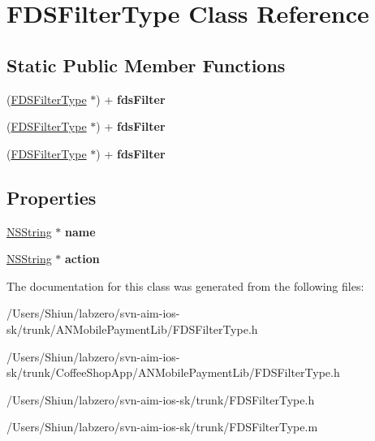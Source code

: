 \hypertarget{interface_f_d_s_filter_type}{
\section{FDSFilterType Class Reference}
\label{interface_f_d_s_filter_type}
}
\subsection*{Static Public Member Functions}
\begin{DoxyCompactItemize}
\item 
\hypertarget{interface_f_d_s_filter_type_a51b8a32200279268d2146917e5ff3239}{
(\hyperlink{interface_f_d_s_filter_type}{FDSFilterType} $\ast$) + {\bfseries fdsFilter}}
\label{interface_f_d_s_filter_type_a51b8a32200279268d2146917e5ff3239}

\item 
\hypertarget{interface_f_d_s_filter_type_a51b8a32200279268d2146917e5ff3239}{
(\hyperlink{interface_f_d_s_filter_type}{FDSFilterType} $\ast$) + {\bfseries fdsFilter}}
\label{interface_f_d_s_filter_type_a51b8a32200279268d2146917e5ff3239}

\item 
\hypertarget{interface_f_d_s_filter_type_a51b8a32200279268d2146917e5ff3239}{
(\hyperlink{interface_f_d_s_filter_type}{FDSFilterType} $\ast$) + {\bfseries fdsFilter}}
\label{interface_f_d_s_filter_type_a51b8a32200279268d2146917e5ff3239}

\end{DoxyCompactItemize}
\subsection*{Properties}
\begin{DoxyCompactItemize}
\item 
\hypertarget{interface_f_d_s_filter_type_a1b2305a84c28883d5e6e51a590944d20}{
\hyperlink{class_n_s_string}{NSString} $\ast$ {\bfseries name}}
\label{interface_f_d_s_filter_type_a1b2305a84c28883d5e6e51a590944d20}

\item 
\hypertarget{interface_f_d_s_filter_type_a785a8d3b58c7dbfd44e742485341a0fc}{
\hyperlink{class_n_s_string}{NSString} $\ast$ {\bfseries action}}
\label{interface_f_d_s_filter_type_a785a8d3b58c7dbfd44e742485341a0fc}

\end{DoxyCompactItemize}


The documentation for this class was generated from the following files:\begin{DoxyCompactItemize}
\item 
/Users/Shiun/labzero/svn-\/aim-\/ios-\/sk/trunk/ANMobilePaymentLib/FDSFilterType.h\item 
/Users/Shiun/labzero/svn-\/aim-\/ios-\/sk/trunk/CoffeeShopApp/ANMobilePaymentLib/FDSFilterType.h\item 
/Users/Shiun/labzero/svn-\/aim-\/ios-\/sk/trunk/FDSFilterType.h\item 
/Users/Shiun/labzero/svn-\/aim-\/ios-\/sk/trunk/FDSFilterType.m\end{DoxyCompactItemize}
